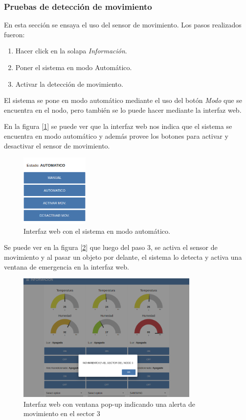 \subsubsection{Pruebas de detección de movimiento}

En esta sección se ensaya el uso del sensor de movimiento. Los pasos realizados fueron:

\begin{enumerate}
\item Hacer click en la solapa {\textit{Información}}.
\item Poner el sistema en modo Automático.
\item Activar la detección de movimiento.
\end{enumerate}

El sistema se pone en modo automático mediante el uso del botón {\textit{Modo}} que se encuentra en el nodo, pero también se lo puede hacer mediante la interfaz web.

En la figura [\ref{fig:interfaz10}] se puede ver que la interfaz web nos indica que el sistema se encuentra en modo automático y además provee los botones para activar y desactivar el sensor de movimiento.

\begin{figure}[h!]
	\centering
	\includegraphics[width=0.3\textwidth]{./Figures/interfaz10.png}
	\caption{Interfaz web con el sistema en modo automático.}
	\label{fig:interfaz10}
\end{figure}

Se puede ver en la figura [\ref{fig:interfaz11}] que luego del paso 3, se activa el sensor de movimiento y al pasar un objeto por delante, el sistema lo detecta y activa una ventana de emergencia en la interfaz web.

\begin{figure}[ht!]
	\centering
	\includegraphics[width=0.8\textwidth]{./Figures/interfaz11.png}
	\caption{Interfaz web con ventana pop-up indicando una alerta de movimiento en el sector 3}
	\label{fig:interfaz11}
\end{figure}


